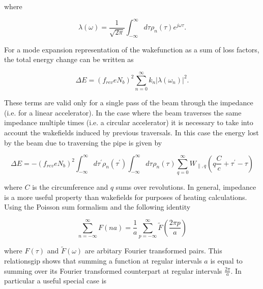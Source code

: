 where 

\begin{equation}
\lambda \left( \omega \right) = \frac{1}{\sqrt{2 \pi}}\int^{\infty}_{-\infty} d \tau \rho_{n} \left( \tau \right) e^{j\omega \tau}. 
\end{equation}

For a mode expansion representation of the wakefunction as a sum of loss factors, the total energy change can be written as 

\begin{equation}
\Delta E = \left( f_{rev} e N_{b}\right)^{2} \displaystyle\sum\limits_{n = 0}^{\infty} k_{n} \left| \lambda \left( \omega_{n} \right)  \right|^{2}.
\end{equation}

These terms are valid only for a single pass of the beam through the impedance (i.e. for a linear accelerator). In the case where the beam traverses the same impedance multiple times (i.e. a circular accelerator) it is necessary to take into account the wakefields induced by previous traversals. In this case the energy lost by the beam due to traversing the pipe is given by

\begin{equation}
\Delta E = - \left( f_{rev} e N_{b}\right)^{2} \int^{\infty}_{-\infty} d\tau^{'} \rho_{n} \left( \tau^{'} \right) \int^{\infty}_{-\infty} d\tau^{} \rho_{n} \left( \tau^{} \right) \displaystyle\sum\limits_{q = 0}^{\infty} W_{\parallel, q} \left( q\frac{C}{c} + \tau^{'} - \tau \right)  
\label{eqn:sum_wake_loss}
\end{equation}

where $C$ is the circumference and $q$ sums over revolutions. In general, impedance is a more useful property than wakefields for purposes of heating calculations. Using the Poisson sum formalism and the following identity

\begin{equation}
\displaystyle\sum\limits_{n = -\infty}^{\infty} F \left( n a \right) = \frac{1}{a} \displaystyle\sum\limits_{p = -\infty}^{\infty} \tilde{F} \left( \frac{2\pi p}{a} \right)
\end{equation}

where $F(\tau)$ and $\tilde{F}(\omega)$ are arbitary Fourier transformed pairs. This relationsgip shows that summing a function at regular intervals $a$ is equal to summing over its Fourier transformed counterpart at regular intervals $\frac{2 \pi}{a}$. In particular a useful special case is

